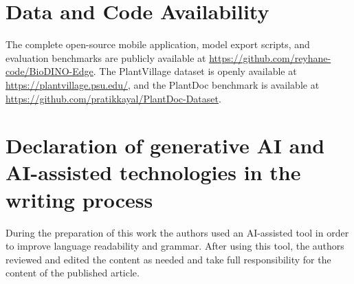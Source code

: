 \documentclass[preprint,12pt]{elsarticle}
\begin{document}
\section*{Data and Code Availability}
The complete open-source mobile application, model export scripts, and evaluation benchmarks are publicly available at \url{https://github.com/reyhane-code/BioDINO-Edge}. The PlantVillage dataset is openly available at \url{https://plantvillage.psu.edu/}, and the PlantDoc benchmark is available at \url{https://github.com/pratikkayal/PlantDoc-Dataset}.

\section*{Declaration of generative AI and AI-assisted technologies in the writing process}
During the preparation of this work the authors used an AI-assisted tool in order to improve language readability and grammar. After using this tool, the authors reviewed and edited the content as needed and take full responsibility for the content of the published article.






\end{document}
